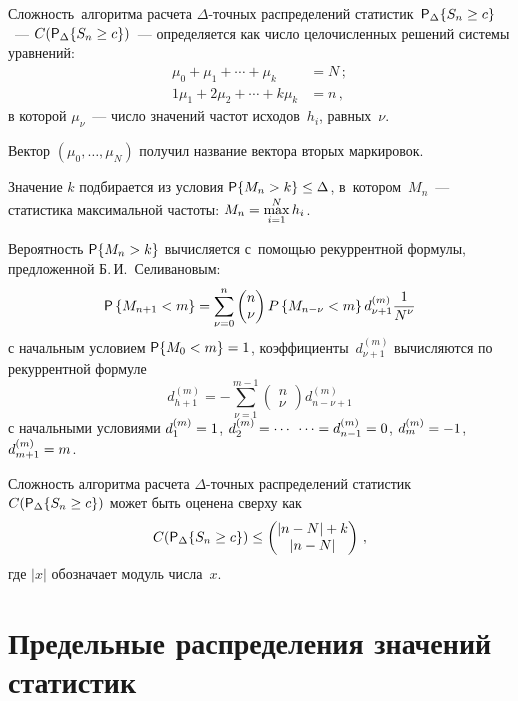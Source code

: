 \begin{multicols}{2}
    Сложность\ алгоритма расчета $\Delta$-точ\-ных рас\-пределений 
статистик~${\sf P}_\Delta\{S_n\hm\geq c\}$~--- $C({\sf P}_\Delta\{S_n\hm\geq c\})$~--- 
определяется как чис\-ло целочисленных решений системы уравнений:
    \begin{align*}
    \mu_0+\mu_1+\cdots +\mu_k &=N\,;\\
    1\mu_1+2\mu_2+\cdots + k \mu_k&=n\,,
    \end{align*}
в которой $\mu_\nu$~--- число значений частот исходов~$h_i$, 
равных~$\nu$. 
 
 Вектор $(\mu_0, \ldots, \mu_N)$ получил название вектора вторых 
маркировок. 
 
 Значение $k$ подбирается из условия ${\sf P}\{M_n\hm>k\}\hm\leq\Delta$, 
в~котором~$M_n$~--- статистика максимальной частоты: $M_n\hm = 
\max\limits_{i=1}^N h_i$. 
 
 Вероятность ${\sf P}\{M_n \hm> k\}$ вычисляется с~помощью рекуррентной 
формулы, предложенной Б.\,И.~Селивановым:
 $$
{\sf P}\left\{M_{n+1} < m\right\} =\sum\limits_{\nu=0}^n \begin{pmatrix}
n\\ \nu\end{pmatrix}  P\left\{ M_{n-\nu} < m\right\}  d_{\nu+1}^{(m)}  
\displaystyle\frac{\displaystyle 1\mathstrut}{\displaystyle N^\nu\mathstrut}
$$
с начальным условием ${\sf P}\{M_0\hm<m\} \hm= 1$, 
коэффициенты~$d_{\nu+1}^{(m)}$ вычисляются по рекуррентной формуле 
$$
d_{h+1}^{(m)}= -\sum\limits_{\nu=1}^{m-1}\begin{pmatrix}
n\\ \nu\end{pmatrix} d^{(m)}_{n-\nu+1}
$$
с начальными условиями $d_1^{(m)}\hm= 1$, $d_2^{(m)}\hm=\cdots $\linebreak
$\cdots = 
d^{(m)}_{n-1}\hm= 0$, $d_m^{(m)}\hm=-1$, $d^{(m)}_{m+1}\hm= m$.

    Сложность алгоритма расчета $\Delta$-точ\-ных рас\-пределений 
статистик $C({\sf P}_\Delta\{S_n\hm\geq c\})$ может быть оценена сверху как
    $$
    C({\sf P}_\Delta\{S_n\hm\geq c\})\leq \begin{pmatrix}
    \vert n-N\vert+k\\ 
    \vert n-N\vert
    \end{pmatrix}\,,
    $$
    где $\vert x\vert$ обозначает модуль числа~$x$.
    
\section{Предельные распределения значений статистик} 
    

\end{multicols}
